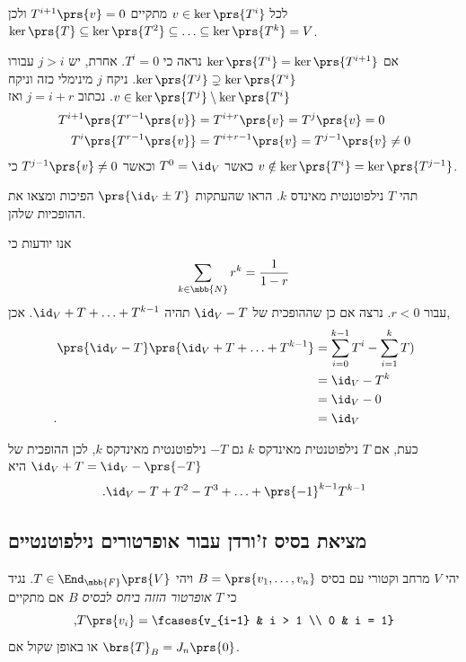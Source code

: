 \documentclass[a4paper,10pt,twoside,openany]{book}
\begin{document}
\begin{solution} 
לכל
$v \in \ker\prs{T^i}$
מתקיים
$T^{i+1}\prs{v} = 0$
ולכן
$\ker\prs{T} \subseteq \ker\prs{T^2} \subseteq \ldots \subseteq \ker\prs{T^k} = V$.

אם
$\ker\prs{T^i} = \ker\prs{T^{i+1}}$
נראה כי
$T^i = 0$.
אחרת, יש
$j > i$
עבורו
$\ker\prs{T^j} \supsetneq \ker\prs{T^i}$.
ניקח
$j$
מינימלי כזה וניקח
$v \in \ker\prs{T^j} \setminus \ker\prs{T^i}$.
נכתוב
$j = i + r$
ואז
\begin{align*}
T^{i+1}\prs{T^{r-1}\prs{v}} &= T^{i+r}\prs{v} = T^j\prs{v} = 0 \\
T^i\prs{T^{r-1}\prs{v}} &= T^{i+r-1}\prs{v} = T^{j-1}\prs{v} \neq 0
\end{align*}
כאשר
$T^0 = \id_V$
וכאשר
$T^{j-1}\prs{v} \neq 0$
כי
$v \notin \ker\prs{T^i} = \ker\prs{T^{j-1}}$.
\end{solution}

\begin{exercisechap}
תהי
$T$
נילפוטנטית מאינדס
$k$.
הראו שהעתקות
$\prs{\id_V \pm T}$
הפיכות ומצאו את ההופכיות שלהן.
\end{exercisechap}

\begin{solution}
אנו יודעות כי
\[\sum_{k \in \mbb{N}} r^k = \frac{1}{1-r}\]
עבור
$r < 0$.
נרצה אם כן שההופכית של
$\id_V - T$
תהיה
$\id_V + T + \ldots + T^{k-1}$.
אכן,
\begin{align*}
\prs{\id_V - T}\prs{\id_V + T + \ldots + T^{k-1}} &= \sum_{i = 0}^{k-1} T^{i} - \sum_{i = 1}^k T^^i
\\&= \id_V - T^k
\\&= \id_V - 0
\\ \text{.} \hphantom{\prs{\id_V - T}\prs{\id_V + T + \ldots + T^{k-1}}} &= \id_V
\end{align*}

כעת, אם
$T$
נילפוטנטית מאינדקס
$k$
גם
$-T$
נילפוטנטית מאינדקס
$k$,
לכן ההופכית של
$\id_V + T = \id_V - \prs{-T}$
היא
\[\text{.} \id_V - T + T^2 - T^3 + \ldots + \prs{-1}^{k-1} T^{k-1}\]
\end{solution}

\subsection{מציאת בסיס ז'ורדן עבור אופרטורים נילפוטנטיים}

\begin{definition}
יהי
$V$
מרחב וקטורי עם בסיס
$B = \prs{v_1, \ldots, v_n}$
ויהי
$T \in \End_{\mbb{F}}\prs{V}$.
נגיד כי
$T$
\emph{אופרטור הזזה ביחס לבסיס
$B$}
אם מתקיים
\[\text{,} T\prs{v_i} = \fcases{v_{i-1} & i > 1 \\ 0 & i = 1}\]
או באופן שקול אם
$\brs{T}_B = J_n\prs{0}$.
\end{definition}
\end{document}
